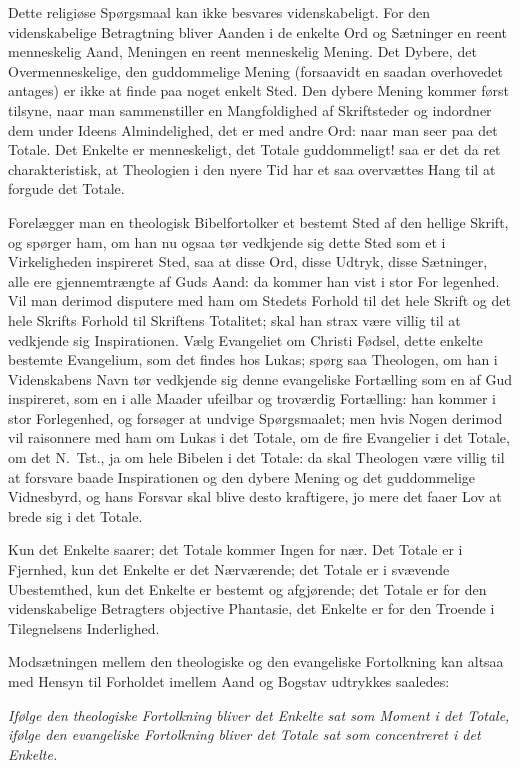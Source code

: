 \documentclass[12pt,a4paper]{book}
\newcommand{\opage}[1]{\marginnote{\footnotesize\textit{[#1]}}}
\begin{document}
Dette religiøse Spørgsmaal kan ikke besvares videnskabeligt. For den
videnskabelige Betragtning bliver Aanden i de enkelte Ord og Sætninger en
reent menneskelig Aand, Meningen en reent menneskelig Mening. Det Dybere, det
Overmenneskelige, den guddommelige Mening (forsaavidt en saadan overhovedet
antages) er ikke at finde paa noget enkelt Sted. Den dybere Mening kommer
først tilsyne, naar man sammenstiller en Mangfoldighed af Skriftsteder og
indordner dem under Ideens Almindelighed, det er med andre Ord: naar man seer
paa det Totale. Det Enkelte er menneskeligt, det Totale guddommeligt! saa er
det da ret charakteristisk, at Theologien i den nyere Tid har et saa
overvættes Hang til at forgude det Totale.

Forelægger man en theologisk Bibelfortolker et bestemt Sted af den hellige
Skrift, og spørger ham, om han nu ogsaa tør vedkjende sig dette Sted som et i
Virkeligheden inspireret Sted, saa at disse Ord, disse Udtryk, disse
Sætninger, alle ere gjennemtrængte af Guds Aand: da kommer han vist i stor
For\-%
\opage{68}legenhed. Vil man derimod disputere med ham om Stedets Forhold til det hele
Skrift og det hele Skrifts Forhold til Skriftens Totalitet; skal han strax
være villig til at vedkjende sig Inspirationen. Vælg Evangeliet om Christi
Fødsel, dette enkelte bestemte Evangelium, som det findes hos Lukas; spørg
saa Theologen, om han i Videnskabens Navn tør vedkjende sig denne evangeliske
Fortælling som en af Gud inspireret, som en i alle Maader ufeilbar og
troværdig Fortælling: han kommer i stor Forlegenhed, og forsøger at undvige
Spørgsmaalet; men hvis Nogen derimod vil raisonnere med ham om Lukas i det
Totale, om de fire Evangelier i det Totale, om det N.\ Tst., ja om hele
Bibelen i det Totale: da skal Theologen være villig til at forsvare baade
Inspirationen og den dybere Mening og det guddommelige Vidnesbyrd, og hans
Forsvar skal blive desto kraftigere, jo mere det faaer Lov at brede sig i det
Totale.

Kun det Enkelte saarer; det Totale kommer Ingen for nær. Det Totale er i
Fjernhed, kun det Enkelte er det Nærværende; det Totale er i svævende
Ubestemthed, kun det Enkelte er bestemt og afgjørende; det Totale er for den
videnskabelige Betragters objective Phantasie, det Enkelte er for den Troende
i Tilegnelsens Inderlighed.

Modsætningen mellem den theologiske og den evangeliske Fortolkning kan altsaa
med Hensyn til Forholdet imellem Aand og Bogstav udtrykkes saaledes:

\emph{Ifølge den theologiske Fortolkning bliver det Enkelte sat som Moment i
det Totale, ifølge den evangeliske Fortolkning bliver det Totale sat som
concentreret i det Enkelte.}
\end{document}
